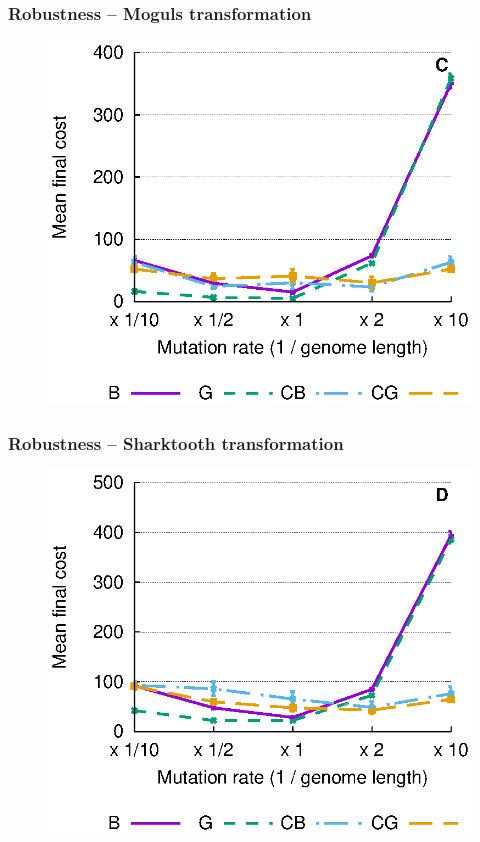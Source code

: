 \documentclass{beamer}
\theoremstyle{plain}
\theoremstyle{definition}
\begin{document}
\begin{frame}
   \frametitle{Robustness -- Moguls transformation}
   \vspace{3cm}
   \begin{figure}
      \includegraphics[trim=0 4.2cm 0 0,scale=.7]{pres_mutrates_c}
   \end{figure}
   \vspace{-4.5cm}
\end{frame}
\begin{frame}
   \frametitle{Robustness -- Sharktooth transformation}
   \vspace{3cm}
   \begin{figure}
      \includegraphics[trim=0 4.2cm 0 0,scale=.7]{pres_mutrates_d}
   \end{figure}
   \vspace{-4.5cm}
\end{frame}
\end{document}
